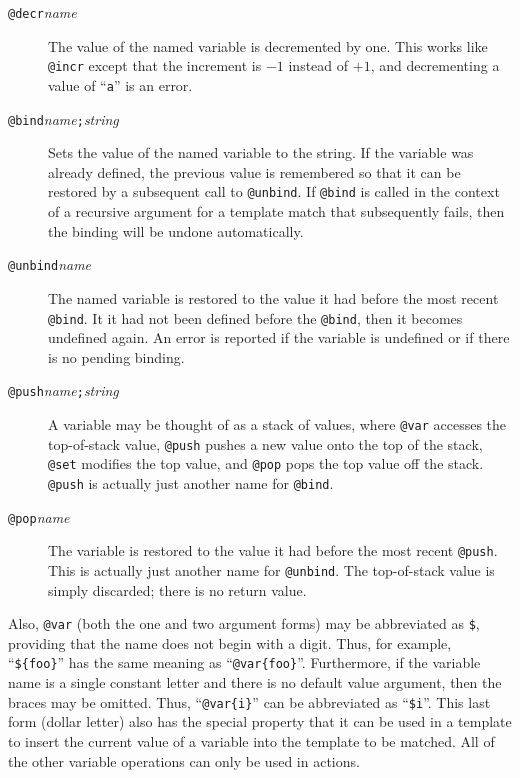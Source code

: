 \begin{description}
\item[{\tt @decr\ttlb}{\it name}{\tt \ttrb}]
The value of the named variable is decremented by one.
This works like \verb|@incr| except that the increment is $-1$ instead of $+1$,
and decrementing a value of ``\verb|a|'' is an error.

\item[{\tt @bind\ttlb}{\it name}{\tt ;}{\it string}{\tt \ttrb}]
Sets the value of the named variable to the string.  If the variable was
already defined, the previous value is remembered so that it can be
restored by a subsequent call to \verb|@unbind|.
If \verb|@bind| is called in the context of a recursive argument for a
template match that subsequently fails, then the binding will be undone
automatically.

\item[{\tt @unbind\ttlb}{\it name}{\tt \ttrb}]
The named variable is restored to the value it had before the most
recent \verb|@bind|.  It it had not been defined before the \verb|@bind|,
then it becomes undefined again.
An error is reported if the variable is undefined or if there is no
pending binding.

\item[{\tt @push\ttlb}{\it name}{\tt ;}{\it string}{\tt \ttrb}]
A variable may be thought of as a stack of values, where \verb|@var|
accesses the top-of-stack value, \verb|@push| pushes a new value onto the
top of the stack, \verb|@set| modifies the top value,
and \verb|@pop| pops the top value off the stack.
\verb|@push| is actually just another name for \verb|@bind|.

\item[{\tt @pop\ttlb}{\it name}{\tt \ttrb}]
The variable is restored to the value it had before the most recent
\verb|@push|.  This is actually just another name for \verb|@unbind|.
The top-of-stack value is simply discarded; there is no return value.
\end{description}

Also, \verb|@var| (both the one and two argument forms) may be abbreviated as
\verb|$|, providing that the name does not begin with a digit.
Thus, for example, ``\verb|${foo}|'' has the same meaning as
``\verb|@var{foo}|''.  Furthermore, if the variable name is a single
constant letter and there is no default value argument, then the braces
may be omitted.  Thus,
``\verb|@var{i}|'' can be abbreviated as ``\verb|$i|''.
This last form (dollar letter) also has the special property that it can
be used in a
template to insert the current value of a variable into the template to
be matched.  All of the other variable operations can only be used in
actions.

